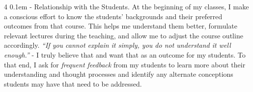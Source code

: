 \documentclass[10pt]{article}
\makeatletter
\def \paragraph {%
    \@startsection{paragraph}%
        {4}%
        \z@%
        {0.1em}
        {-\fontdimen 6 \font}%
        {\normalfont \bfseries}%
    }
\makeatother
\begin{document}
\paragraph{Relationship with the Students.}
At the beginning of my classes, I make a conscious effort to know the students' backgrounds and their 
preferred outcomes from that course. This helps me understand them better, formulate relevant lectures during the teaching, and allow me to adjust the course outline accordingly. 
\textit{``If you cannot explain it simply, you do not understand it well enough.''} - I truly believe that and want that as an outcome for my students. To that end, I ask for 
\textit{frequent feedback} from my students
to learn more about their understanding and thought processes and identify any alternate conceptions students may have that need to be addressed. 
%
\end{document}
